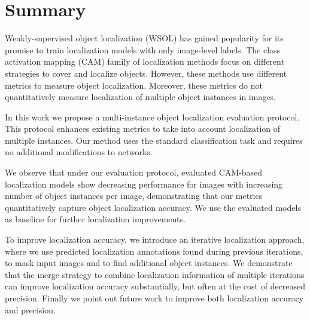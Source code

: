 \chapter*{Summary}

Weakly-supervised object localization (WSOL) has gained popularity for its promise to train localization models with only image-level labels. The class activation mapping (CAM) family of localization methods focus on different strategies to cover and localize objects. However, these methods use different metrics to measure object localization. Moreover, these metrics do not quantitatively measure localization of multiple object instances in images.

In this work we propose a multi-instance object localization evaluation protocol. This protocol enhances existing metrics to take into account localization of multiple instances. Our method uses the standard classification task and requires no additional modifications to networks.

We observe that under our evaluation protocol, evaluated CAM-based localization models show decreasing performance for images with increasing number of object instances per image, demonstrating that our metrics quantitatively capture object localization accuracy. We use the evaluated models as baseline for further localization improvements.

To improve localization accuracy, we introduce an iterative localization approach, where we use predicted localization annotations found during previous iterations, to mask input images and to find additional object instances. We demonstrate that the merge strategy to combine localization information of multiple iterations can improve localization accuracy substantially, but often at the cost of decreased precision. Finally we point out future work to improve both localization accuracy and precision.